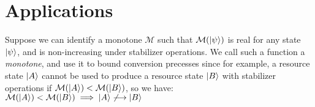 \documentclass[12pt]{dalthesis}
\begin{document}
\chapter{Applications}
Suppose we can identify a monotone $\mathcal{M}$ such that $\mathcal{M}(\ket{\psi})$ is real for any state $\ket{\psi}$, and is non-increasing under stabilizer operations. We call such a function a \textit{monotone}, and use it to bound conversion precesses since for example, a resource state $\ket{A}$ cannot be used to produce a resource state $\ket{B}$ with stabilizer operations if $\mathcal{M}(\ket{A}) < \mathcal{M}(\ket{B})$, so we have: $\mathcal{M}(\ket{A}) < \mathcal{M}(\ket{B}) \implies \ket{A} \not \longrightarrow \ket{B} $
%
%
\end{document}
